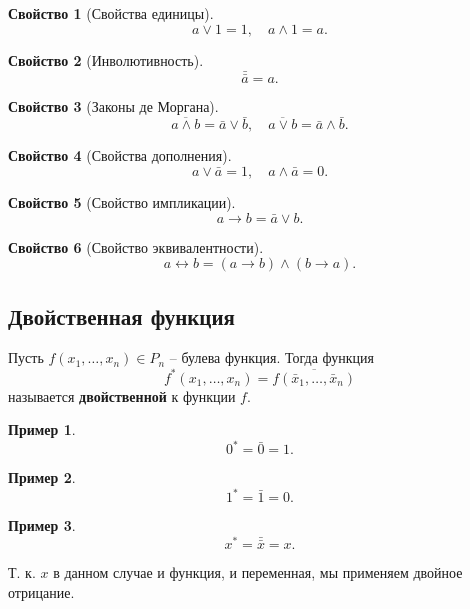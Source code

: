 \documentclass[a5paper, 11pt]{extarticle}
\theoremstyle{definition}
\newtheorem{property}{Свойство}[subsection]
\newtheorem{example}{Пример}[subsection]
\theoremstyle{definition}
\theoremstyle{definition}
\numberwithin{figure}{section}
\numberwithin{table}{section}
\begin{document}
\begin{property}[Свойства единицы]
    \[
        a \lor 1 = 1,
        \quad
        a \land 1 = a.
    \]
\end{property}

\begin{property}[Инволютивность]
    \[
        \bar{\bar{a}} = a.
    \]
\end{property}

\begin{property}[Законы де Моргана]
    \[
        \overline{a \land b} = \bar{a} \lor \bar{b},
        \quad
        \overline{a \lor b} = \bar{a} \land \bar{b}.
    \]
\end{property}

\begin{property}[Свойства дополнения]
    \[
        a \lor \bar{a} = 1,
        \quad
        a \land \bar{a} = 0.
    \]
\end{property}

\begin{property}[Свойство импликации]
    \[
        a \to b = \bar{a} \lor b.
    \]
\end{property}

\begin{property}[Свойство эквивалентности]
    \[
        a \leftrightarrow b = (a \to b) \land (b \to a).
    \]
\end{property}

\subsection{Двойственная функция}

Пусть \(f(x_1, \ldots, x_n) \in P_n\) -- булева функция. Тогда функция
\[
    f^*(x_1, \ldots, x_n) = \overline{f(\bar{x}_1, \ldots, \bar{x}_n)}
\]
называется \textbf{двойственной} к функции \(f\).

\begin{example}
    \[
        0^* = \bar{0} = 1.
    \]
\end{example}

\begin{example}
    \[
        1^* = \bar{1} = 0.
    \]
\end{example}

\begin{example}
    \[
        x^* = \bar{\bar{x}} = x.
    \]

    Т. к. \(x\) в данном случае и функция, и переменная, мы применяем двойное отрицание.
\end{example}
\end{document}
